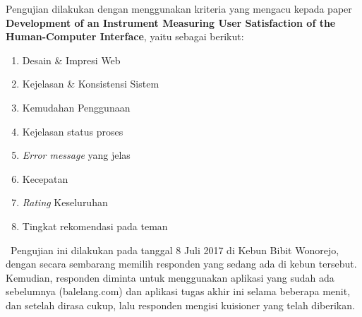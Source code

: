 Pengujian dilakukan dengan menggunakan kriteria yang mengacu kepada paper \textbf{Development of an Instrument Measuring User Satisfaction of the Human-Computer Interface}\cite{chin_development_1998}, yaitu sebagai berikut:
\begin{enumerate}
	\item Desain \& Impresi Web
	\item Kejelasan \& Konsistensi Sistem
	\item Kemudahan Penggunaan
	\item Kejelasan status proses
	\item \textit{Error message} yang jelas
	\item Kecepatan
	\item \textit{Rating} Keseluruhan
	\item Tingkat rekomendasi pada teman
\end{enumerate}
\ \indent Pengujian ini dilakukan pada tanggal 8 Juli 2017 di Kebun Bibit Wonorejo, dengan secara sembarang memilih responden yang sedang ada di kebun tersebut. Kemudian, responden diminta untuk menggunakan aplikasi yang sudah ada sebelumnya (balelang.com) dan aplikasi tugas akhir ini selama beberapa menit, dan setelah dirasa cukup, lalu responden mengisi kuisioner yang telah diberikan.